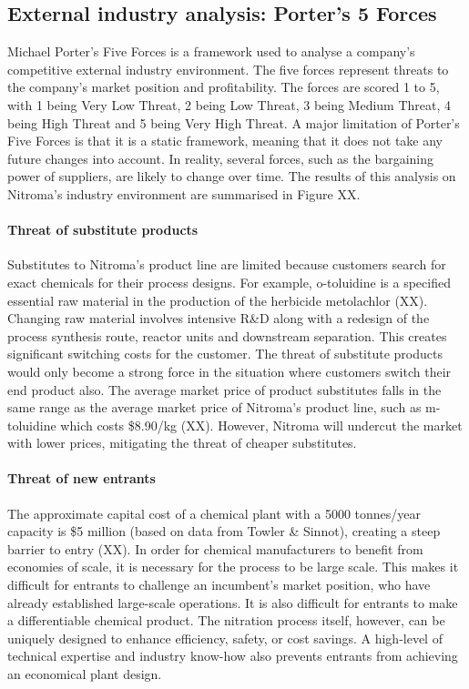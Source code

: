 \subsection{External industry analysis: Porter's 5 Forces}
Michael Porter’s Five Forces is a framework used to analyse a company’s competitive external industry environment. The five forces represent threats to the company’s market position and profitability. The forces are scored 1 to 5, with 1 being Very Low Threat, 2 being Low Threat, 3 being Medium Threat, 4 being High Threat and 5 being Very High Threat. A major limitation of Porter’s Five Forces is that it is a static framework, meaning that it does not take any future changes into account. In reality, several forces, such as the bargaining power of suppliers, are likely to change over time. The results of this analysis on Nitroma’s industry environment are summarised in Figure XX.

\paragraph{Threat of substitute products}
Substitutes to Nitroma’s product line are limited because customers search for exact chemicals for their process designs. For example, o-toluidine is a specified essential raw material in the production of the herbicide metolachlor (XX). Changing raw material involves intensive R\&D along with a redesign of the process synthesis route, reactor units and downstream separation. This creates significant switching costs for the customer. The threat of substitute products would only become a strong force in the situation where customers switch their end product also. The average market price of product substitutes falls in the same range as the average market price of Nitroma’s product line, such as m-toluidine which costs \$8.90/kg (XX). However, Nitroma will undercut the market with lower prices, mitigating the threat of cheaper substitutes.

\paragraph{Threat of new entrants}
The approximate capital cost of a chemical plant with a 5000 tonnes/year capacity is \$5 million (based on data from Towler \& Sinnot), creating a steep barrier to entry (XX). In order for chemical manufacturers to benefit from economies of scale, it is necessary for the process to be large scale. This makes it difficult for entrants to challenge an incumbent’s market position, who have already established large-scale operations. It is also difficult for entrants to make a differentiable chemical product. The nitration process itself, however, can be uniquely designed to enhance efficiency, safety, or cost savings. A high-level of technical expertise and industry know-how also prevents entrants from achieving an economical plant design. 

